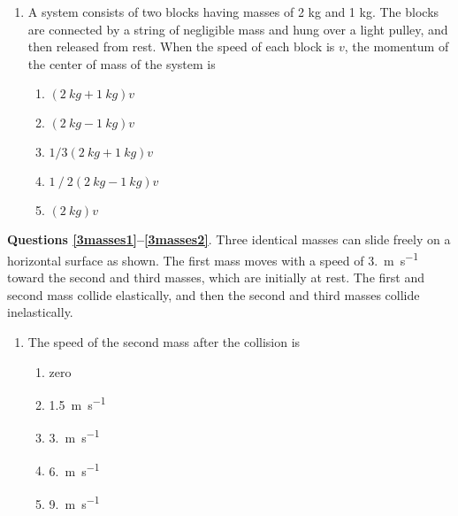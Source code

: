 \documentclass{../../../oss-classkick}
\begin{document}
\begin{multicols}{2}
\begin{enumerate}[leftmargin=18pt,resume]
    \begin{center}
    \end{center}
  \item A system consists of two blocks having masses of 2 kg and 1 kg. The
    blocks are connected by a string of negligible mass and hung over a light
    pulley, and then released from rest. When the speed of each block is $v$,
    the momentum of the center of mass of the system is
    \begin{enumerate}[nosep,leftmargin=18pt,label=(\Alph*)]
    \item$(\SI{2}{kg} + \SI{1}{kg})v$
    \item$(\SI{2}{kg} - \SI{1}{kg})v$
    \item$1/3 (\SI{2}{kg} +\SI{1}{kg})v$
    \item$1⁄2 (\SI{2}{kg} -\SI{1}{kg})v$
    \item$(\SI{2}{kg})v$
    \end{enumerate}
    \columnbreak
    
   
  \end{enumerate}
  
  \textbf{Questions \ref{3masses1}--\ref{3masses2}}. Three identical masses can
  slide freely on a horizontal surface as shown. The first mass moves with a
  speed of \SI{3.}{\metre\per\second} toward the second and third masses, which
  are initially at rest. The first and second mass collide elastically, and
  then the second and third masses collide inelastically.
  \begin{center}
  \end{center}
  \begin{enumerate}[leftmargin=18pt,resume]
  \item The speed of the second mass after the collision is
    \label{3masses1}
    \begin{enumerate}[nosep,leftmargin=18pt,label=(\Alph*)]
    \item zero
    \item\SI{1.5}{\metre\per\second}
    \item\SI{3.}{\metre\per\second}
    \item\SI{6.}{\metre\per\second}
    \item\SI{9.}{\metre\per\second}
    \end{enumerate}


\end{enumerate}
\end{multicols}
\end{document}

